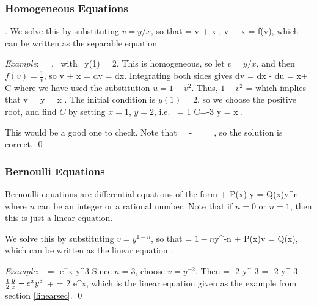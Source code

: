 \documentclass[12pt]{book}
\begin{document}
\subsubsection{Homogeneous Equations}
\be
{}.
\ee
We solve this by substituting $v=y/x$, so that
\bee
{} = v + x ,
\quad \implies \quad
v + x  = f(v),
\eee
which can be written as the separable equation
\bee
{}.
\eee

\noindent \emph{Example}:
\bee
{} = , \mbox{ with } y(1) = 2.
\eee
This is homogeneous, so let $v=y/x$, and then $f(v) = \frac{1}{v}$, so
\bee
v + x  = 
\quad \implies \quad
{} dv = dx.
\eee
Integrating both sides gives
\bee
\int {}dv = \int {} dx
\quad \implies \quad
- \int {}du = \ln x+ \ln C
\eee
where we have used the substitution $u = 1-v^2$. Thus,
\bee
\ln\(1-v^2 \) = \ln {}
\eee
which implies that
\bee
v = \pm {}
\quad \implies \quad
y = \pm x .
\eee
The initial condition is $y(1)=2$, so we choose the positive root, and
find $C$ by setting $x=1$, $y=2$, i.e.\
 = 1 \times {}
\quad \implies \quad
C=-3
\quad \implies \quad
y = x .
\eee

This would be a good one to check. Note that
\bee
{} =  - 
= \frac{1}{\sqrt{1+\frac{3}{x^2}}}
= ,
\eee
so the solution is correct. \qed

\subsubsection{Bernoulli Equations}
Bernoulli equations are differential equations of the form
\bee
{} + P(x) y = Q(x)y^n
\eee
where $n$ can be an integer or a rational number. Note that if
$n=0$ or $n=1$, then this is just a linear equation.

We solve this by substituting $v=y^{1-n}$, so that
\bee
{} = \(1-n\)y^{-n}
\quad \implies \quad
{}  + P(x)v = Q(x),
\eee
which can be written as the linear equation
\be
{}.
\ee

\noindent\emph{Example}:
\bee
{} -\half {} = -e^x y^3
\eee
Since $n=3$, choose $v=y^{-2}$. Then
\bee
{} = -2 y^{-3} 
\quad \implies \quad
{} = -2 y^{-3}\( \half \frac{y}{x}  - e^x y^3\)
\quad \implies \quad
{} +  = 2 e^x,
\eee
which is the linear equation given as the example from section \ref{linearsec}.
\qed
\end{document}
